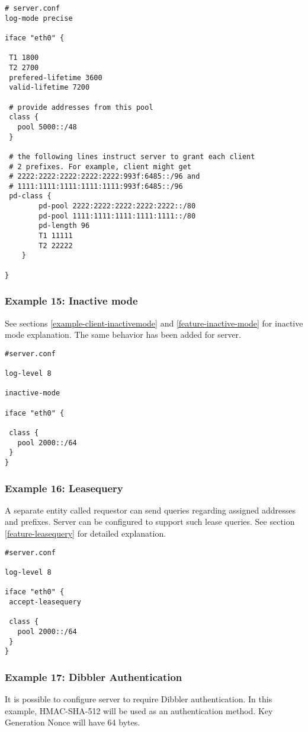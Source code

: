 \begin{lstlisting}
# server.conf
log-mode precise

iface "eth0" {

 T1 1800
 T2 2700
 prefered-lifetime 3600
 valid-lifetime 7200

 # provide addresses from this pool
 class {
   pool 5000::/48
 }

 # the following lines instruct server to grant each client
 # 2 prefixes. For example, client might get
 # 2222:2222:2222:2222:2222:993f:6485::/96 and
 # 1111:1111:1111:1111:1111:993f:6485::/96
 pd-class {
        pd-pool 2222:2222:2222:2222:2222::/80
        pd-pool 1111:1111:1111:1111:1111::/80
        pd-length 96
        T1 11111
        T2 22222
    }

}
\end{lstlisting}

\subsubsection{Example 15: Inactive mode}
\label{example-server-inactivemode}
See sections \ref{example-client-inactivemode} and
\ref{feature-inactive-mode} for inactive mode explanation.
The same behavior has been added for server.

\begin{lstlisting}
#server.conf

log-level 8

inactive-mode

iface "eth0" {

 class {
   pool 2000::/64
 }
}
\end{lstlisting}

\subsubsection{Example 16: Leasequery}
A separate entity
called requestor can send queries regarding assigned addresses and
prefixes. Server can be configured to support such lease queries.
See section \ref{feature-leasequery} for detailed explanation.

\begin{lstlisting}
#server.conf

log-level 8

iface "eth0" {
 accept-leasequery

 class {
   pool 2000::/64
 }
}
\end{lstlisting}


\subsubsection{Example 17: Dibbler Authentication}
\label{example-server-auth}
It is possible to configure server to require Dibbler authentication. In this
example, HMAC-SHA-512 will be used as an authentication method.
Key Generation Nonce will have 64 bytes.

